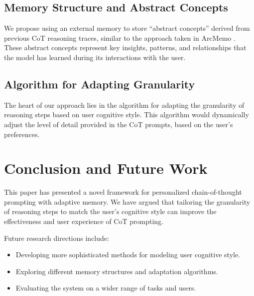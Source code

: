 \documentclass{article}
\begin{document}
\subsection{Memory Structure and Abstract Concepts}

We propose using an external memory to store ``abstract concepts'' derived from previous CoT reasoning traces, similar to the approach taken in ArcMemo \cite{ho2025arcmemo}. These abstract concepts represent key insights, patterns, and relationships that the model has learned during its interactions with the user.

\subsection{Algorithm for Adapting Granularity}

The heart of our approach lies in the algorithm for adapting the granularity of reasoning steps based on user cognitive style. This algorithm would dynamically adjust the level of detail provided in the CoT prompts, based on the user's preferences.

\section{Conclusion and Future Work}

This paper has presented a novel framework for personalized chain-of-thought prompting with adaptive memory. We have argued that tailoring the granularity of reasoning steps to match the user's cognitive style can improve the effectiveness and user experience of CoT prompting.

Future research directions include:

\begin{itemize}
    \item Developing more sophisticated methods for modeling user cognitive style.
    \item Exploring different memory structures and adaptation algorithms.
    \item Evaluating the system on a wider range of tasks and users.
\end{itemize}



\end{document}
